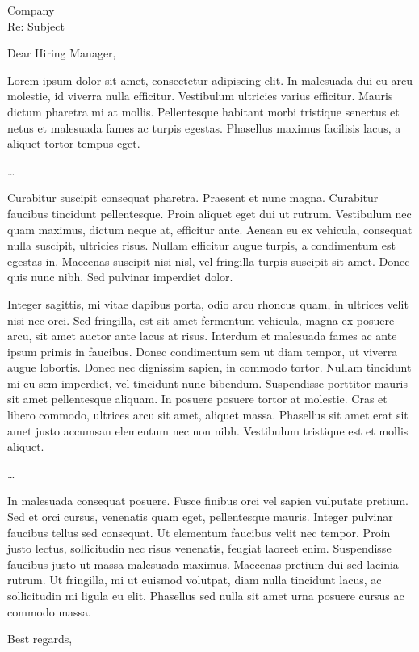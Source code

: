 \documentclass[10pt,a4paper]{letter}
\begin{document}
\begin{letter}
  {Company \\ Re: Subject}
  \pagestyle{plain}

  \opening{Dear Hiring Manager,}

  Lorem ipsum dolor sit amet, consectetur adipiscing elit. In malesuada dui eu
  arcu molestie, id viverra nulla efficitur. Vestibulum ultricies varius
  efficitur. Mauris dictum pharetra mi at mollis. Pellentesque habitant morbi
  tristique senectus et netus et malesuada fames ac turpis egestas. Phasellus
  maximus facilisis lacus, a aliquet tortor tempus eget.

  \ldots

  Curabitur suscipit consequat pharetra. Praesent et nunc magna. Curabitur
  faucibus tincidunt pellentesque. Proin aliquet eget dui ut rutrum.
  Vestibulum nec quam maximus, dictum neque at, efficitur ante. Aenean eu ex
  vehicula, consequat nulla suscipit, ultricies risus. Nullam efficitur augue
  turpis, a condimentum est egestas in. Maecenas suscipit nisi nisl, vel
  fringilla turpis suscipit sit amet. Donec quis nunc nibh. Sed pulvinar
  imperdiet dolor.

  Integer sagittis, mi vitae dapibus porta, odio arcu rhoncus quam, in ultrices
  velit nisi nec orci. Sed fringilla, est sit amet fermentum vehicula, magna ex
  posuere arcu, sit amet auctor ante lacus at risus. Interdum et malesuada
  fames ac ante ipsum primis in faucibus. Donec condimentum sem ut diam tempor,
  ut viverra augue lobortis. Donec nec dignissim sapien, in commodo tortor.
  Nullam tincidunt mi eu sem imperdiet, vel tincidunt nunc bibendum.
  Suspendisse porttitor mauris sit amet pellentesque aliquam. In posuere
  posuere tortor at molestie. Cras et libero commodo, ultrices arcu sit amet,
  aliquet massa. Phasellus sit amet erat sit amet justo accumsan elementum nec
  non nibh. Vestibulum tristique est et mollis aliquet.

  \ldots

  In malesuada consequat posuere. Fusce finibus orci vel sapien vulputate
  pretium. Sed et orci cursus, venenatis quam eget, pellentesque mauris.
  Integer pulvinar faucibus tellus sed consequat. Ut elementum faucibus velit
  nec tempor. Proin justo lectus, sollicitudin nec risus venenatis, feugiat
  laoreet enim. Suspendisse faucibus justo ut massa malesuada maximus.
  Maecenas pretium dui sed lacinia rutrum. Ut fringilla, mi ut euismod
  volutpat, diam nulla tincidunt lacus, ac sollicitudin mi ligula eu elit.
  Phasellus sed nulla sit amet urna posuere cursus ac commodo massa.

  \vspace{2em}
  \closing{Best regards,}
\end{letter}
\end{document}
